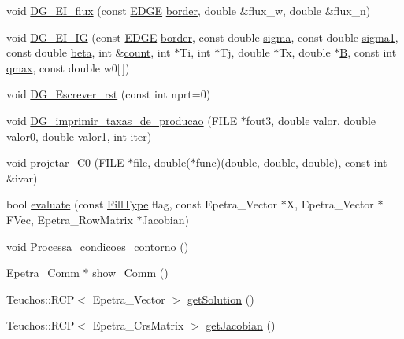 \begin{DoxyCompactItemize}
\item 
void \hyperlink{classDG__Prob_a68cc239c50661a6856fe3f06b4cdc2c0}{D\+G\+\_\+\+E\+I\+\_\+flux} (const \hyperlink{structEDGE}{E\+D\+GE} \hyperlink{classGeProb_a6c144ac05b601c5d6141c711edaaa775}{border}, double \&flux\+\_\+w, double \&flux\+\_\+n)
\item 
void \hyperlink{classDG__Prob_a0096cd2affdd37f2f3d0e7bc807a7b4b}{D\+G\+\_\+\+E\+I\+\_\+\+IG} (const \hyperlink{structEDGE}{E\+D\+GE} \hyperlink{classGeProb_a6c144ac05b601c5d6141c711edaaa775}{border}, const double \hyperlink{classDG__Prob_a93197609da7dbef6707e58bdc32b8d12}{sigma}, const double \hyperlink{classDG__Prob_aa75a7526410f7d21514bf500c01096cd}{sigma1}, const double \hyperlink{classDG__Prob_a6ab4e3c1a81f2c882fab1fb689f5732a}{beta}, int \&\hyperlink{classDG__Prob_a638611f0f0a04508f43ac7554bc8c7e2}{count}, int $\ast$Ti, int $\ast$Tj, double $\ast$Tx, double $\ast$\hyperlink{ASPFunctions_8cpp_a57d673f8d6833fb7a7aced326df10ca9}{B}, const int \hyperlink{DG__EI__Header_8h_ae7d322bf04f258ba21ba82aed62c1895}{qmax}, const double w0\mbox{[}$\,$\mbox{]})
\item 
void \hyperlink{classDG__Prob_a743c25d9cab0343541fccea15cae73a1}{D\+G\+\_\+\+Escrever\+\_\+rst} (const int nprt=0)
\item 
void \hyperlink{classDG__Prob_afd8b8c1330587f232b2f1bd9f9cc8a38}{D\+G\+\_\+imprimir\+\_\+taxas\+\_\+de\+\_\+producao} (F\+I\+LE $\ast$fout3, double valor, double valor0, double valor1, int iter)
\item 
void \hyperlink{classDG__Prob_acbf4eefc45872a673a1491b776921d31}{projetar\+\_\+\+C0} (F\+I\+LE $\ast$file, double($\ast$func)(double, double, double), const int \&ivar)
\item 
bool \hyperlink{classDG__Prob_a688755c84a90df6d927d9a10a286878f}{evaluate} (const \hyperlink{GeProb_8hpp_a1a1e1116ad09d261fce9538a3cf76060}{Fill\+Type} flag, const Epetra\+\_\+\+Vector $\ast$X, Epetra\+\_\+\+Vector $\ast$F\+Vec, Epetra\+\_\+\+Row\+Matrix $\ast$Jacobian)
\item 
void \hyperlink{classDG__Prob_a7933929b9873b4e40fc5152bd746dcf3}{Processa\+\_\+condicoes\+\_\+contorno} ()
\item 
Epetra\+\_\+\+Comm $\ast$ \hyperlink{classGeProb_a810c17dc99110efbb57b8ad28adc5cb7}{show\+\_\+\+Comm} ()
\item 
Teuchos\+::\+R\+CP$<$ Epetra\+\_\+\+Vector $>$ \hyperlink{classGeProb_ae29860923e40758aa1a7810556bb0f8e}{get\+Solution} ()
\item 
Teuchos\+::\+R\+CP$<$ Epetra\+\_\+\+Crs\+Matrix $>$ \hyperlink{classGeProb_a5c8159fd807c26eaec5c0a9fa72636f6}{get\+Jacobian} ()

\end{DoxyCompactItemize}
